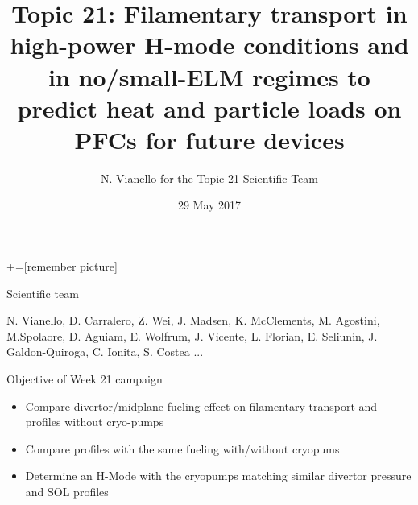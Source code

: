 \documentclass[10pt, compress]{beamer}
\title{{\small Topic 21: Filamentary transport in high-power H-mode conditions and in no/small-ELM regimes to predict heat and particle loads on PFCs for future devices }}
\date{29 May 2017}
\author[Topic 21 Scientific Team]{N. Vianello for the Topic 21 Scientific Team}
\begin{document}
+=[remember picture]
\maketitle
\begin{frame}{Scientific team}
  \begin{center}
N. Vianello, D. Carralero, Z. Wei, J. Madsen, K. McClements,
M. Agostini, M.Spolaore, D. Aguiam, E. Wolfrum, J. Vicente,
L. Florian, E. Seliunin, J. Galdon-Quiroga, C. Ionita, S. Costea ...
  \end{center}
\end{frame}
\begin{frame}{Objective of Week 21 campaign}
  \begin{itemize}[<+-|alert@+>]
    \item Compare divertor/midplane fueling effect on filamentary
      transport and profiles without cryo-pumps
    \item Compare profiles with the same fueling with/without cryopums
    \item Determine an H-Mode with the cryopumps matching similar
      divertor pressure and SOL profiles
  \end{itemize}    
\end{frame}
\end{document}
